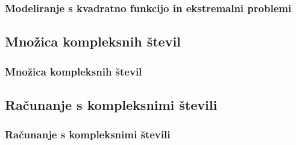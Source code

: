         \begin{frame}
            \frametitle{Modeliranje s kvadratno funkcijo in ekstremalni problemi}
        \end{frame}

    \subsection{Množica kompleksnih števil}

        \begin{frame}
            \frametitle{Množica kompleksnih števil}
        \end{frame}

    \subsection{Računanje s kompleksnimi števili}

        \begin{frame}
            \frametitle{Računanje s kompleksnimi števili}
        \end{frame}
